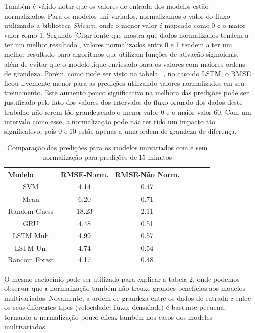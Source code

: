 Também é válido notar que os valores de entrada dos modelos estão normalizados. Para os modelos uni-variados, normalizamos o valor do fluxo utilizando a biblioteca \textit{Sklearn}, onde o menor valor é mapeado como 0 e o maior valor como 1. Segundo [Citar fonte que mostra que dados normalizados tendem a ter um melhor resultado], valores normalizados entre 0 e 1 tendem a ter um melhor resultado para algoritmos que utilizam funções de ativação sigmoidais, além de evitar que o modelo fique enviesado para os valores com maiores ordens de grandeza. Porém, como pode ser visto na tabela 1, no caso do \acrfull{LSTM}, o \acrfull{RMSE} ficou levemente menor para as predições utilizando valores normalizados em seu treinamento. Este aumento pouco significativo na melhora das predições pode ser justificado pelo fato dos valores dos intervalos do fluxo oriundo dos dados deste trabalho não serem tão grande,sendo o menor valor 0 e o maior valor 60. Com um intervalo como esse, a normalização pode não ter tido um impacto tão significativo, pois 0 e 60 estão apenas a uma ordem de grandeza de diferença.

\begin{table}[H]
    \caption{Comparação das predições para os modelos univariados com e sem normalização para predições de 15 minutos}
    \label{table:RmseComparison}
    \begin{center}
    \begin{tabular}{ccccccc}
    \hline
    \multicolumn{1}{l}{\textbf{Modelo}} & \multicolumn{1}{l}{\textbf{RMSE-Norm.}} & \multicolumn{1}{l}{\textbf{RMSE-Não Norm.}}\\
    \hline
    SVM & 4.14 & 0.47  \\
    Mean & 6.20 & 0.71  \\
    Random Guess & 18.23 & 2.11\\
    GRU & 4.48 & 0.51  \\ 
    LSTM Mult & 4.99 &  0.57  \\ 
    LSTM Uni & 4.74 &  0.54  \\ 
    Random Forest & 4.17 & 0.48 \\
    \hline
    \end{tabular}
    \end{center}
\end{table}


O mesmo raciocínio pode ser utilizado para explicar a tabela 2, onde podemos observar que a normalização também não trouxe grandes benefícios aos modelos multivariados. Novamente, a ordem de grandeza entre os dados de entrada e entre os seus diferentes tipos (velocidade, fluxo, densidade) é bastante pequena, tornando a normalização pouco eficaz também nos casos dos modelos multivariados.

